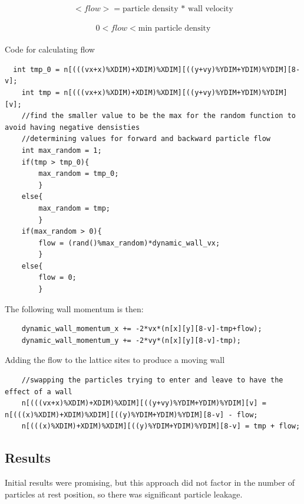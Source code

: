\documentclass{article}
\begin{document}
$$
<flow> = \textrm{particle density * wall velocity}$$\\
$$0 < flow < \textrm{min particle density}$$\\




Code for calculating flow
\begin{verbatim}
  int tmp_0 = n[(((vx+x)%XDIM)+XDIM)%XDIM][((y+vy)%YDIM+YDIM)%YDIM][8-v];
    int tmp = n[(((vx+x)%XDIM)+XDIM)%XDIM][((y+vy)%YDIM+YDIM)%YDIM][v];
	//find the smaller value to be the max for the random function to avoid having negative densisties
    //determining values for forward and backward particle flow
	int max_random = 1;
	if(tmp > tmp_0){
		max_random = tmp_0;
		}
	else{
		max_random = tmp;
		}
	if(max_random > 0){
		flow = (rand()%max_random)*dynamic_wall_vx;
		}
	else{
		flow = 0;
		}
\end{verbatim}
\vspace{5mm}
The following wall momentum is then:
\begin{verbatim}
    dynamic_wall_momentum_x += -2*vx*(n[x][y][8-v]-tmp+flow);
    dynamic_wall_momentum_y += -2*vy*(n[x][y][8-v]-tmp);
    \end{verbatim}
\vspace{5mm}


\vspace{5mm}
Adding the flow to the lattice sites to produce a moving wall
\begin{verbatim}
    //swapping the particles trying to enter and leave to have the effect of a wall
    n[(((vx+x)%XDIM)+XDIM)%XDIM][((y+vy)%YDIM+YDIM)%YDIM][v] = n[(((x)%XDIM)+XDIM)%XDIM][((y)%YDIM+YDIM)%YDIM][8-v] - flow;
    n[(((x)%XDIM)+XDIM)%XDIM][((y)%YDIM+YDIM)%YDIM][8-v] = tmp + flow;		
    \end{verbatim}
\vspace{5mm}

\subsection{Results}

Initial results were promising, but this approach did not factor in the number of particles at rest position, so there was significant particle leakage.
\end{document}
